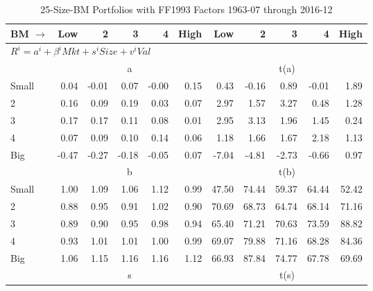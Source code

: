 
\begin{table}[!ht]
\centering
\caption{25-Size-BM Portfolios with FF1993 Factors 1963-07 through 2016-12}
\begin{tabular}{lrrrrrrrrrr}
  \toprule
    BM $\rightarrow$ & Low & 2 & 3 & 4 & High & Low & 2 & 3 & 4 & High \\ 
  \midrule
  \multicolumn{11}{l}{$R^i=a^i+\beta^iMkt+s^iSize+v^iVal$} \\

  
    
      & \multicolumn{5}{c}{a} & \multicolumn{5}{c}{t(a)}
    
    \\
      \cmidrule(r){2-6} \cmidrule(r){7-11}

    Small   & 0.04  & -0.01  & 0.07  & -0.00  & 0.15  & 0.43  & -0.16  & 0.89  & -0.01  & 1.89  \\
         2  & 0.16  & 0.09  & 0.19  & 0.03  & 0.07  & 2.97  & 1.57  & 3.27  & 0.48  & 1.28  \\
         3  & 0.17  & 0.17  & 0.11  & 0.08  & 0.01  & 2.95  & 3.13  & 1.96  & 1.45  & 0.24  \\
         4  & 0.07  & 0.09  & 0.10  & 0.14  & 0.06  & 1.18  & 1.66  & 1.67  & 2.18  & 1.13  \\
    Big     & -0.47  & -0.27  & -0.18  & -0.05  & 0.07  & -7.04  & -4.81  & -2.73  & -0.66  & 0.97  \\

  
    
      & \multicolumn{5}{c}{b} & \multicolumn{5}{c}{t(b)}
    
    \\
      \cmidrule(r){2-6} \cmidrule(r){7-11}

    Small   & 1.00  & 1.09  & 1.06  & 1.12  & 0.99  & 47.50  & 74.44  & 59.37  & 64.44  & 52.42  \\
         2  & 0.88  & 0.95  & 0.91  & 1.02  & 0.90  & 70.69  & 68.73  & 64.74  & 68.14  & 71.16  \\
         3  & 0.89  & 0.90  & 0.95  & 0.98  & 0.94  & 65.40  & 71.21  & 70.63  & 73.59  & 88.82  \\
         4  & 0.93  & 1.01  & 1.01  & 1.00  & 0.99  & 69.07  & 79.88  & 71.16  & 68.28  & 84.36  \\
    Big     & 1.06  & 1.15  & 1.16  & 1.16  & 1.12  & 66.93  & 87.84  & 74.77  & 67.78  & 69.69  \\

  
    
      & \multicolumn{5}{c}{s} & \multicolumn{5}{c}{t(s)}
    

\end{tabular}
\end{table}
